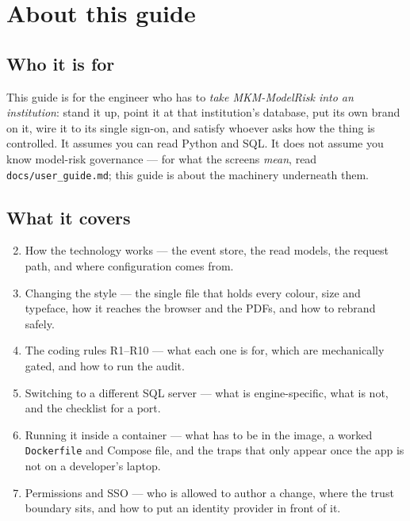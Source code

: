 \documentclass[11pt]{article}
\begin{document}
\tableofcontents
\clearpage

\section{About this guide}

\subsection{Who it is for}

This guide is for the engineer who has to \emph{take MKM-ModelRisk into an institution}:
stand it up, point it at that institution's database, put its own brand on it, wire it to
its single sign-on, and satisfy whoever asks how the thing is controlled. It assumes you
can read Python and SQL. It does not assume you know model-risk governance --- for what
the screens \emph{mean}, read \texttt{docs/user\_guide.md}; this guide is about the
machinery underneath them.

\subsection{What it covers}

\begin{enumerate}[label=\S\arabic*.]
  \setcounter{enumi}{1}
  \item How the technology works --- the event store, the read models, the request path,
        and where configuration comes from.
  \item Changing the style --- the single file that holds every colour, size and typeface,
        how it reaches the browser and the PDFs, and how to rebrand safely.
  \item The coding rules R1--R10 --- what each one is for, which are mechanically gated,
        and how to run the audit.
  \item Switching to a different SQL server --- what is engine-specific, what is not, and
        the checklist for a port.
  \item Running it inside a container --- what has to be in the image, a worked
        \texttt{Dockerfile} and Compose file, and the traps that only appear once the app
        is not on a developer's laptop.
  \item Permissions and SSO --- who is allowed to author a change, where the trust
        boundary sits, and how to put an identity provider in front of it.
\end{enumerate}
\end{document}
